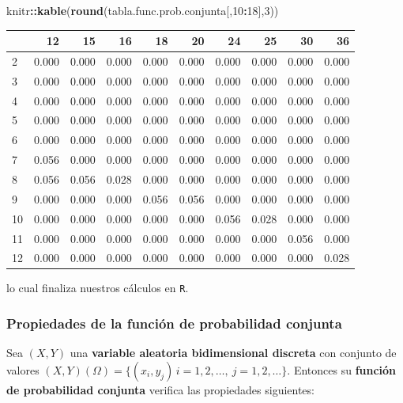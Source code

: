 \documentclass[]{book}
\newenvironment{Shaded}{\begin{snugshade}}{\end{snugshade}}
\newcommand{\DecValTok}[1]{\textcolor[rgb]{0.00,0.00,0.81}{#1}}
\newcommand{\KeywordTok}[1]{\textcolor[rgb]{0.13,0.29,0.53}{\textbf{#1}}}
\newcommand{\NormalTok}[1]{#1}
\newcommand{\OperatorTok}[1]{\textcolor[rgb]{0.81,0.36,0.00}{\textbf{#1}}}
\begin{document}
\begin{Shaded}
\begin{Highlighting}[]
\NormalTok{knitr}\OperatorTok{::}\KeywordTok{kable}\NormalTok{(}\KeywordTok{round}\NormalTok{(tabla.func.prob.conjunta[,}\DecValTok{10}\OperatorTok{:}\DecValTok{18}\NormalTok{],}\DecValTok{3}\NormalTok{))}
\end{Highlighting}
\end{Shaded}

\begin{tabular}{l|r|r|r|r|r|r|r|r|r}
\hline
  & 12 & 15 & 16 & 18 & 20 & 24 & 25 & 30 & 36\\
\hline
2 & 0.000 & 0.000 & 0.000 & 0.000 & 0.000 & 0.000 & 0.000 & 0.000 & 0.000\\
\hline
3 & 0.000 & 0.000 & 0.000 & 0.000 & 0.000 & 0.000 & 0.000 & 0.000 & 0.000\\
\hline
4 & 0.000 & 0.000 & 0.000 & 0.000 & 0.000 & 0.000 & 0.000 & 0.000 & 0.000\\
\hline
5 & 0.000 & 0.000 & 0.000 & 0.000 & 0.000 & 0.000 & 0.000 & 0.000 & 0.000\\
\hline
6 & 0.000 & 0.000 & 0.000 & 0.000 & 0.000 & 0.000 & 0.000 & 0.000 & 0.000\\
\hline
7 & 0.056 & 0.000 & 0.000 & 0.000 & 0.000 & 0.000 & 0.000 & 0.000 & 0.000\\
\hline
8 & 0.056 & 0.056 & 0.028 & 0.000 & 0.000 & 0.000 & 0.000 & 0.000 & 0.000\\
\hline
9 & 0.000 & 0.000 & 0.000 & 0.056 & 0.056 & 0.000 & 0.000 & 0.000 & 0.000\\
\hline
10 & 0.000 & 0.000 & 0.000 & 0.000 & 0.000 & 0.056 & 0.028 & 0.000 & 0.000\\
\hline
11 & 0.000 & 0.000 & 0.000 & 0.000 & 0.000 & 0.000 & 0.000 & 0.056 & 0.000\\
\hline
12 & 0.000 & 0.000 & 0.000 & 0.000 & 0.000 & 0.000 & 0.000 & 0.000 & 0.028\\
\hline
\end{tabular}

lo cual finaliza nuestros cálculos en \texttt{R}.

\hypertarget{propiedades-de-la-funciuxf3n-de-probabilidad-conjunta}{%
\subsubsection{Propiedades de la función de probabilidad conjunta}\label{propiedades-de-la-funciuxf3n-de-probabilidad-conjunta}}

Sea \((X,Y)\) una \textbf{variable aleatoria bidimensional discreta} con conjunto de valores \((X,Y)(\Omega)=\{(x_i,y_j)\, i=1,2,\ldots,\ j=1,2,\ldots\}\). Entonces su \textbf{función de probabilidad conjunta} verifica las propiedades siguientes:
\end{document}
